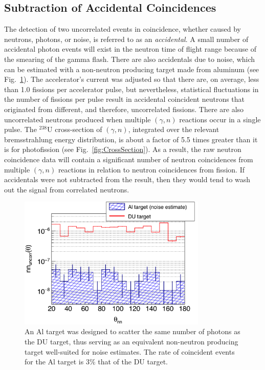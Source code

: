 \subsection{Subtraction of Accidental Coincidences}
\label{Reconstruction of Accidental Coincidence}
The detection of two uncorrelated events in coincidence, whether caused by neutrons, photons, or noise, is referred to as an \emph{accidental}.
A small number of accidental photon events will exist in the neutron time of flight range because of the smearing of the gamma flash.
There are also accidentals due to noise, which can be estimated with a non-neutron producing target made from aluminum (see Fig.~\ref{fig:Noise}).
The accelerator's current was adjusted so that there are, on average, less than 1.0 fissions per accelerator pulse, but nevertheless, statistical fluctuations in the number of fissions per pulse result in accidental coincident neutrons that originated from different, and therefore, uncorrelated fissions.
There are also uncorrelated neutrons produced when multiple $(\gamma, n)$ reactions occur in a single pulse.
The $^{238}$U cross-section of $(\gamma, n)$, integrated over the relevant bremsstrahlung energy distribution, is about a factor of 5.5 times greater than it is for photofission (see Fig.~\ref{fig:CrossSection}).
As a result, the raw neutron coincidence data will contain a significant number of neutron coincidences from multiple $(\gamma, n)$ reactions in relation to neutron coincidences from fission.
If accidentals were not subtracted from the result, then they would tend to wash out the signal from correlated neutrons. 
\begin{figure}[]
\centering
    \includegraphics[width=0.8\textwidth]{Content/Methods/Noise.png}
    \caption{An Al target was designed to scatter the same number of photons as the DU target, thus serving as an equivalent non-neutron producing target well-suited for noise estimates.
    The rate of coincident events for the Al target is 3\% that of the DU target. 
        }
    \label{fig:Noise}
\end{figure}
